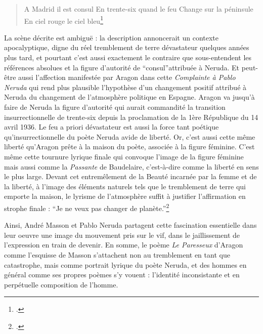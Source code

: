 \begin{verse}
A Madrid il est consul 
En trente-six quand le feu
Change sur la péninsule
En ciel rouge le ciel bleu\footcite{pabloneruda}	
\end{verse}
 
	La scène décrite est ambiguë : la description annoncerait un contexte apocalyptique, digne du réel tremblement de terre dévastateur quelques années plus tard, et pourtant c’est aussi exactement le contraire que sous-entendent les références absolues et la figure d’autorité de \enquote{consul}attribuée à Neruda. Et peut-être aussi l’affection manifestée par Aragon dans cette \emph{Complainte à Pablo Neruda} qui rend plus plausible l’hypothèse d’un changement positif attribué à Neruda du changement de l’atmosphère politique en Espagne. Aragon va jusqu'à faire de Neruda la figure d’autorité qui aurait commandité la transition insurrectionnelle de trente-six depuis la proclamation de la 1ère République du 14 avril 1936. Le feu a priori dévastateur est aussi la force tant poétique qu’insurrectionnelle du poète Neruda avide de liberté. Or, c’est aussi cette même liberté qu’Aragon prête à la maison du poète, associée à la figure féminine. C’est même cette tournure lyrique finale qui convoque l’image de la figure féminine mais aussi comme la \emph{Passante} de Baudelaire, c'est-à-dire comme la liberté en sens le plus large. Devant cet entremêlement de la Beauté incarnée par la femme et de la liberté, à l’image des éléments naturels tels que le tremblement de terre qui emporte la maison, le lyrisme de l’atmosphère suffit à justifier l’affirmation en strophe finale : \enquote{Je ne veux pas changer de planète.}\footcite{pabloneruda}

Ainsi, André Masson et Pablo Neruda partagent cette fascination essentielle dans leur oeuvre une image du mouvement pris sur le vif, dans le jaillissement de l’expression en train de devenir. En somme, le poème \emph{Le Paresseux} d’Aragon comme l’esquisse de Masson s’attachent non au tremblement en tant que catastrophe, mais comme portrait lyrique du poète Neruda, et des hommes en général comme ses propres poèmes s’y vouent : l’identité inconsistante et en perpétuelle composition de l’homme.

